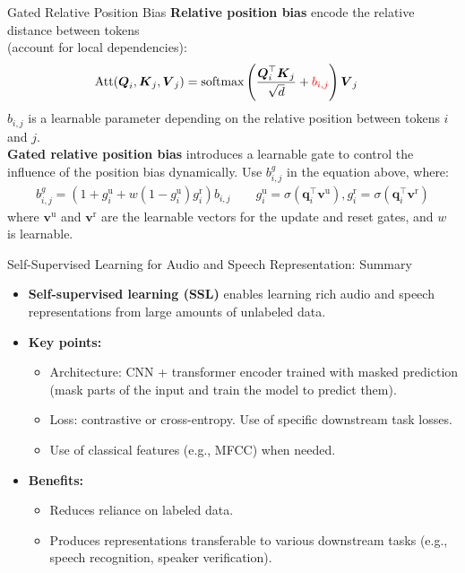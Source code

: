 \documentclass[11pt,aspectratio=169,usenames,dvipsnames]{beamer}
\newcommand{\bs}{\boldsymbol}
\begin{document}
\begin{frame}{Gated Relative Position Bias}
    \textbf{Relative position bias} encode the relative distance between tokens\\ (account for local dependencies):
        \begin{align*}
            \text{Att}(\bs{Q}_i, \bs{K}_j, \bs{V}_j) &= \text{softmax}\left(\frac{\bs{Q}_i^\top\bs{K}_j}{\sqrt{d}} + {\color{red}b_{i, j}}\right)\bs{V}_j
        \end{align*}
        $b_{i, j}$ is a learnable parameter depending on the relative position between tokens $i$ and $j$.\vspace{\baselineskip}\\

    \textbf{Gated relative position bias} introduces a learnable gate to control the influence of the position bias dynamically. Use $b_{i,j}^g$ in the equation above, where:
    \begin{align*}
        b_{i,j}^g =  (1+g_i^{\textrm{u}}+ w(1-g_i^{\textrm{u}})g_i^{\textrm{r}})b_{i,j} \qquad g_i^{\textrm{u}} = \sigma(\bs{q}_i^\top\bs{v}^{\textrm{u}}), g_i^{\textrm{r}} = \sigma(\bs{q}_i^\top\bs{v}^{\textrm{r}})
    \end{align*}
    where $\bs{v}^{\textrm{u}}$ and $\bs{v}^{\textrm{r}}$ are the learnable vectors for the update and reset gates, and $w$ is learnable.
\end{frame}

\begin{frame}{Self-Supervised Learning for Audio and Speech Representation: Summary}
    \begin{itemize}
        \item \textbf{Self-supervised learning (SSL)} enables learning rich audio and speech representations from large amounts of unlabeled data.
        \item \textbf{Key points:}
        \begin{itemize}
            \item Architecture: CNN + transformer encoder trained with masked prediction (mask parts of the input and train the model to predict them).
            \item Loss: contrastive or cross-entropy. Use of specific downstream task losses.
            \item Use of classical features (e.g., MFCC) when needed.
        \end{itemize}
        \item \textbf{Benefits:}
        \begin{itemize}
            \item Reduces reliance on labeled data.
            \item Produces representations transferable to various downstream tasks (e.g., speech recognition, speaker verification).
        \end{itemize}
    \end{itemize}
\end{frame}
\end{document}
